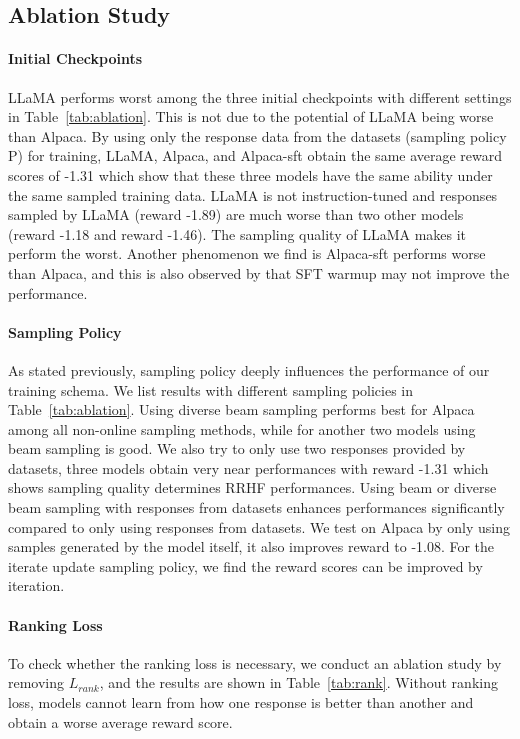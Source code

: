 \subsection{Ablation Study}

\paragraph{Initial Checkpoints} 
\label{sec:init}
LLaMA performs worst among the three initial checkpoints with different settings in Table~\ref{tab:ablation}.
This is not due to the potential of LLaMA being worse than Alpaca. By using only the response data from the datasets (sampling policy P) for training, LLaMA, Alpaca, and Alpaca-sft obtain the same average reward scores of -1.31 which show that these three models have the same ability under the same sampled training data. LLaMA is not instruction-tuned and responses sampled by LLaMA (reward -1.89) are much worse than two other models (reward -1.18 and reward -1.46). The sampling quality of LLaMA makes it perform the worst. Another phenomenon we find is Alpaca-sft performs worse than Alpaca, and this is also observed by \citet{rl4lms} that SFT warmup may not improve the performance.

\paragraph{Sampling Policy} As stated previously, sampling policy deeply influences the performance of our training schema. We list results with different sampling policies in Table~\ref{tab:ablation}. 
Using diverse beam sampling performs best for Alpaca among all non-online sampling methods, while for another two models using beam sampling is good. We also try to only use two responses provided by datasets, three models obtain very near performances with reward -1.31 which shows sampling quality determines RRHF performances. Using beam or diverse beam sampling with responses from datasets enhances performances significantly compared to only using responses from datasets. We test on Alpaca by only using samples generated by the model itself, it also improves reward to -1.08. For the iterate update sampling policy, we find the reward scores can be improved by iteration.

\paragraph{Ranking Loss}

To check whether the ranking loss is necessary, we conduct an ablation study by removing $L_{rank}$, and the results are shown in Table~\ref{tab:rank}. Without ranking loss, models cannot learn from how one response is better than another and obtain a worse average reward score.


